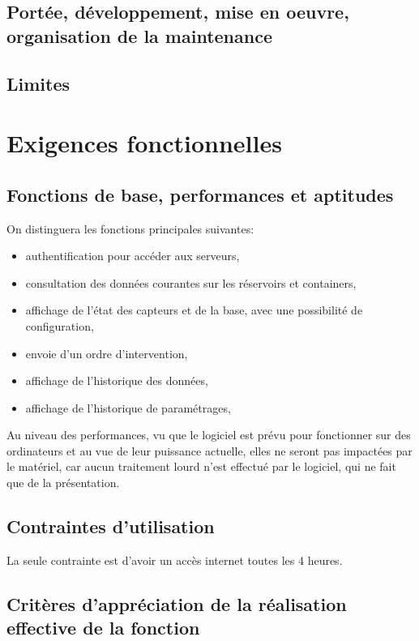 \subsection{Portée, développement, mise en oeuvre, organisation de la maintenance}
\subsection{Limites}

\section{Exigences fonctionnelles}
\subsection{Fonctions de base, performances et aptitudes}
On distinguera les fonctions principales suivantes:
\begin{itemize}
	\item authentification pour accéder aux serveurs,
	\item consultation des données courantes sur les réservoirs et containers,
	\item affichage de l'état des capteurs et de la base, avec une possibilité de configuration,
	\item envoie d'un ordre d'intervention,
	\item affichage de l'historique des données,
	\item affichage de l'historique de paramétrages,
\end{itemize}

Au niveau des performances, vu que le logiciel est prévu pour fonctionner sur des ordinateurs et au vue de leur puissance actuelle, elles ne seront pas impactées par le matériel, car aucun traitement lourd n'est effectué par le logiciel, qui ne fait que de la présentation.

\subsection{Contraintes d'utilisation}
La seule contrainte est d'avoir un accès internet toutes les 4 heures.

\subsection{Critères d'appréciation de la réalisation effective de la fonction}

